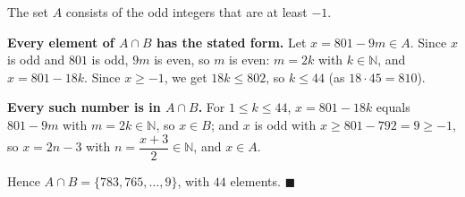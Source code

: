 The set $A$ consists of the odd integers that are at least $-1$.

\textbf{Every element of $A\cap B$ has the stated form.} Let $x=801-9m\in A$. Since $x$ is odd and $801$ is odd, $9m$ is even, so $m$ is even: $m=2k$ with $k\in\mathbb N$, and $x=801-18k$. Since $x\ge-1$, we get $18k\le802$, so $k\le44$ (as $18\cdot45=810$).

\textbf{Every such number is in $A\cap B$.} For $1\le k\le44$, $x=801-18k$ equals $801-9m$ with $m=2k\in\mathbb N$, so $x\in B$; and $x$ is odd with $x\ge801-792=9\ge-1$, so $x=2n-3$ with $n=\dfrac{x+3}{2}\in\mathbb N$, and $x\in A$.

Hence $A\cap B=\{783,765,\dots,9\}$, with $\boxed{44}$ elements. $\blacksquare$
